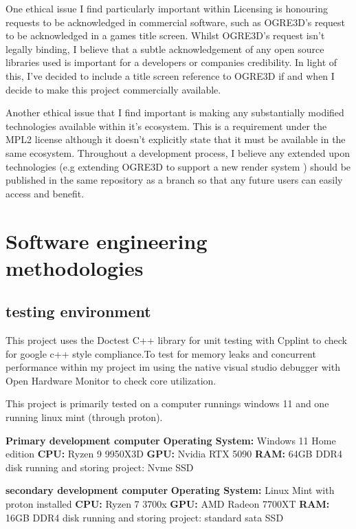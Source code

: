 \documentclass[]{final_report}
\begin{document}
One ethical issue I find particularly important within Licensing is honouring requests to be acknowledged in commercial software, such as OGRE3D's request to be acknowledged in a games title screen. Whilst OGRE3D's request isn't legally binding, I believe that a subtle acknowledgement of any open source libraries used is important for a developers or companies credibility. In light of this, I've decided to include a title screen reference to OGRE3D if and when I decide to make this project commercially available.

Another ethical issue that I find important is making any substantially modified technologies available within it's ecosystem. This is a requirement under the MPL2 license although it doesn't explicitly state that it must be available in the same ecosystem. Throughout a development process, I believe any extended upon technologies (e.g extending OGRE3D to support a new render system ) should be published in the same repository as a branch so that any future users can easily access and benefit.

\chapter{Software engineering methodologies}
\section{testing environment}
This project uses the Doctest C++ library for unit testing with Cpplint to check for google c++ style compliance.To test for memory leaks and concurrent performance within my project im using the native visual studio debugger with Open Hardware Monitor to check core utilization.

This project is primarily tested on a computer runnings windows 11 and one running linux mint (through proton).

\textbf{Primary development computer } \newline
\textbf{Operating System:} Windows 11 Home edition \newline
\textbf{CPU:} Ryzen 9 9950X3D \newline
\textbf{GPU:} Nvidia RTX 5090 \newline
\textbf{RAM:} 64GB DDR4 \newline
disk running and storing project: Nvme SSD \newline

\textbf{secondary development computer} \newline
\textbf{Operating System:} Linux Mint with proton installed \newline
\textbf{CPU:} Ryzen 7 3700x \newline
\textbf{GPU:} AMD Radeon 7700XT \newline
\textbf{RAM:} 16GB DDR4 \newline
disk running and storing project: standard sata SSD \newline
\end{document}
